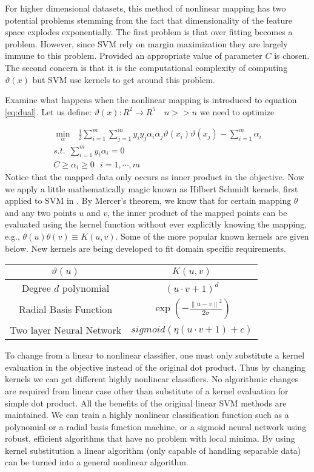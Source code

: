 For higher dimensional datasets, this method of nonlinear mapping has two potential problems stemming from the fact that dimensionality of the feature space explodes exponentially. The first problem is that over fitting becomes a problem. However, since SVM rely on margin maximization they are largely immune to this problem. Provided an appropriate value of parameter $C$ is chosen. The second concern is that it is the computational complexity of   computing $\vartheta(x)$ but SVM use kernels to get around this problem.  

Examine what happens when  the nonlinear mapping is introduced to equation \ref{eq:dual}. Let us define: $\vartheta(x):R^2\rightarrow R^5 \quad n>> n$  we need to optimize

\begin{equation}
\begin{array}{c}
\min_{\alpha} \ \ \   \frac{1}{2} \sum_{i=1}^{m}{\sum_{j=1}^{m}{y_iy_j\alpha_i\alpha_j\vartheta(x_i)\vartheta(x_j)}} - \sum_{i=1}^{m}{\alpha_i} \\
s.t. \ \ \sum_{i=1}^{m}{y_i\alpha_i}=0   \\
 C \geq \alpha_i \geq 0  \ \ \ i=1,\cdots , m 
 \end{array} 
\label{eq:dualkernel}
\end{equation}
Notice that the mapped data only occurs as inner product in the objective. Now we apply a little mathematically magic known as Hilbert Schmidt kernels, first applied to SVM in \cite{svmintroduce}.  By Mercer's theorem, we know that for certain mapping $\theta$ and any two points $u$ and $v$, the inner product of the mapped points can be evaluated using the kernel function without ever explicitly knowing the mapping, e.g., $\theta(u)\theta(v)\equiv K(u,v)$. Some of the more popular known kernels are given below. New kernels are being developed to fit domain specific requirements. 
\begin{center}
	\begin{tabular}{cc}
	$\vartheta(u)$  & $K(u,v)$ \\ \hline 
	Degree $d$ polynomial & $\left(u\cdot v +1\right)^d$ \\ 
	Radial Basis Function & $\exp \left( - \frac{\left\|u-v\right\|^2}{2\sigma}\right) $ \\ 
	Two layer Neural Network& $ sigmoid \left(\eta\left(u\cdot v +1\right)+c\right)$ \\ 
	\end{tabular}
\end{center}
To change from a linear to nonlinear classifier, one must only substitute a kernel evaluation in the objective instead of the original dot product. Thus by changing kernels we can get different highly nonlinear classifiers. No algorithmic changes are required from linear case other than substitute of a kernel evaluation for simple dot product. All the benefits of the original linear SVM methods are maintained. We can train a highly nonlinear classification function such as a polynomial or a radial basis function machine, or a sigmoid neural network using robust, efficient algorithms that have no problem with local minima. By using kernel substitution a linear algorithm (only capable of handling separable data) can be turned into a general nonlinear algorithm. 
